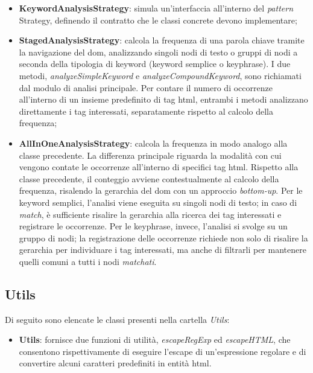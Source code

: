 \begin{itemize}
  \item \textbf{KeywordAnalysisStrategy}: simula un’interfaccia all’interno del \textit{pattern} Strategy, definendo il contratto che le classi concrete devono implementare;
  \item \textbf{StagedAnalysisStrategy}: calcola la frequenza di una parola chiave tramite la navigazione del \gls{dom}, analizzando singoli nodi di testo o gruppi di nodi a seconda della tipologia di keyword (keyword semplice o keyphrase). I due metodi, \textit{analyzeSimpleKeyword} e \textit{analyzeCompoundKeyword}, sono richiamati dal modulo di analisi principale. Per contare il numero di occorrenze all’interno di un insieme predefinito di tag \gls{html}, entrambi i metodi analizzano direttamente i tag interessati, separatamente rispetto al calcolo della frequenza;
  \item \textbf{AllInOneAnalysisStrategy}: calcola la frequenza in modo analogo alla classe precedente. La differenza principale riguarda la modalità con cui vengono contate le occorrenze all’interno di specifici tag \gls{html}. Rispetto alla classe precedente, il conteggio avviene contestualmente al calcolo della frequenza, risalendo la gerarchia del \gls{dom} con un approccio \textit{bottom-up}. Per le keyword semplici, l’analisi viene eseguita su singoli nodi di testo; in caso di \textit{match}, è sufficiente risalire la gerarchia alla ricerca dei tag interessati e registrare le occorrenze. Per le keyphrase, invece, l’analisi si svolge su un gruppo di nodi; la registrazione delle occorrenze richiede non solo di risalire la gerarchia per individuare i tag interessati, ma anche di filtrarli per mantenere quelli comuni a tutti i nodi \textit{matchati}.
\end{itemize}

\subsection{Utils}

Di seguito sono elencate le classi presenti nella cartella \textit{Utils}:

\begin{itemize}
  \item \textbf{Utils}: fornisce due funzioni di utilità, \textit{escapeRegExp} ed \textit{escapeHTML}, che consentono rispettivamente di eseguire l’escape di un’espressione regolare e di convertire alcuni caratteri predefiniti in entità \gls{html}. 
\end{itemize}

